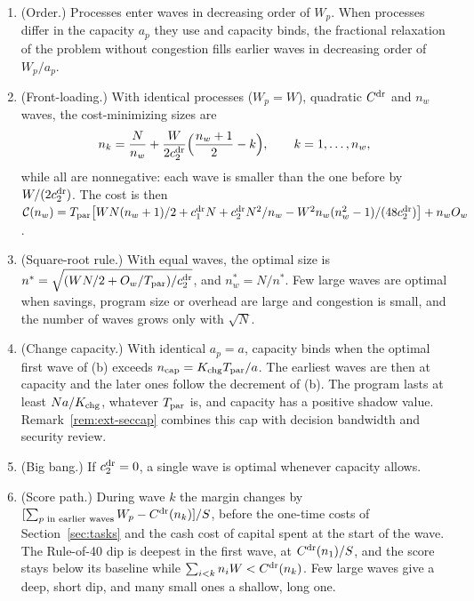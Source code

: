 \begin{proposition}\label{prop:ext-waves}
\begin{enumerate}
\item[(a)] (Order.) Processes enter waves in decreasing order of $W_p$. When processes differ in the capacity $a_p$ they use and capacity binds, the fractional relaxation of the problem without congestion fills earlier waves in decreasing order of $W_p/a_p$.
\item[(b)] (Front-loading.) With identical processes ($W_p=W$), quadratic $C^{\rm dr}$ and $n_w$ waves, the cost-minimizing sizes are
\begin{equation}\label{eq:ext-front}
n_k=\frac N{n_w}+\frac{W}{2c^{\rm dr}_2}\Bigl(\frac{n_w+1}2-k\Bigr),\qquad k=1,\dots,n_w,
\end{equation}
while all are nonnegative: each wave is smaller than the one before by $W/(2c^{\rm dr}_2)$. The cost is then $\mathcal C(n_w)=T_{\rm par}\bigl[WN(n_w+1)/2+c^{\rm dr}_1N+c^{\rm dr}_2N^2/n_w-W^2n_w(n_w^2-1)/(48c^{\rm dr}_2)\bigr]+n_wO_w$.
\item[(c)] (Square-root rule.) With equal waves, the optimal size is $n^*=\sqrt{(WN/2+O_w/T_{\rm par})/c^{\rm dr}_2}$, and $n_w^*=N/n^*$. Few large waves are optimal when savings, program size or overhead are large and congestion is small, and the number of waves grows only with $\sqrt N$.
\item[(d)] (Change capacity.) With identical $a_p=a$, capacity binds when the optimal first wave of (b) exceeds $n_{\rm cap}=K_{\rm chg}T_{\rm par}/a$. The earliest waves are then at capacity and the later ones follow the decrement of (b). The program lasts at least $Na/K_{\rm chg}$, whatever $T_{\rm par}$ is, and capacity has a positive shadow value. Remark~\ref{rem:ext-seccap} combines this cap with decision bandwidth and security review.
\item[(e)] (Big bang.) If $c^{\rm dr}_2=0$, a single wave is optimal whenever capacity allows.
\item[(f)] (Score path.) During wave $k$ the margin changes by $[\sum_{p\text{ in earlier waves}}W_p-C^{\rm dr}(n_k)]/S$, before the one-time costs of Section~\ref{sec:tasks} and the cash cost of capital spent at the start of the wave. The Rule-of-40 dip is deepest in the first wave, at $C^{\rm dr}(n_1)/S$, and the score stays below its baseline while $\sum_{i<k}n_iW<C^{\rm dr}(n_k)$. Few large waves give a deep, short dip, and many small ones a shallow, long one.
\end{enumerate}
\end{proposition}

